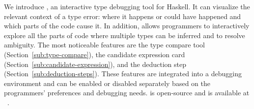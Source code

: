 We introduce \chameleon{}, an interactive type debugging tool for Haskell. It can visualize the relevant context of a type error: where it happens or could have happened and which parts of the code cause it. In addition, \chameleon{} allows programmers to interactively explore all the parts of code where multiple types can be inferred and to resolve ambiguity. The most noticeable features are the type compare tool (Section~\ref{sub:type-compare}), the candidate expression card (Section~\ref{sub:candidate-expression}), and the deduction step (Section~\ref{sub:deduction-steps}). These features are integrated into a debugging environment and can be enabled or disabled separately based on the programmers' preferences and debugging needs. \chameleon{} is open-source and is available at ~\cite{Fu2022-xp}.  




